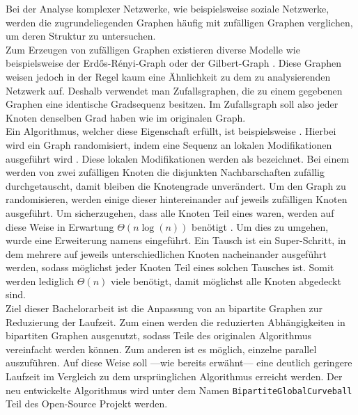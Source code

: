 Bei der Analyse komplexer Netzwerke, wie beispielsweise soziale Netzwerke, 
werden die zugrundeliegenden Graphen häufig mit zufälligen Graphen verglichen, 
um deren Struktur zu untersuchen\cite{DBLP:conf/esa/CarstensH0PTW18}.
\\

Zum Erzeugen von zufälligen Graphen existieren diverse Modelle wie 
beispielsweise der Erd\H{o}s-R\'enyi-Graph \cite{erdos}
oder der Gilbert-Graph \cite{gilbert}.
Diese Graphen
weisen jedoch in der Regel kaum eine Ähnlichkeit zu dem zu analysierenden Netzwerk auf.
Deshalb verwendet man Zufallsgraphen, die zu einem gegebenen Graphen eine identische Gradsequenz
besitzen. Im Zufallsgraph soll also jeder Knoten denselben Grad haben wie im originalen Graph.
\\

Ein Algorithmus, welcher diese Eigenschaft erfüllt, ist beispielsweise \cb{} \cite{curveball}.
Hierbei wird ein Graph randomisiert, indem eine Sequenz an lokalen Modifikationen ausgeführt wird \cite{penschuck2020recent}.
Diese lokalen Modifikationen werden als \ct{} bezeichnet. Bei einem \ct{} werden von zwei zufälligen 
Knoten die disjunkten Nachbarschaften zufällig durchgetauscht, damit bleiben die Knotengrade unverändert.
Um den Graph zu randomisieren, werden einige dieser  hintereinander auf jeweils zufälligen Knoten ausgeführt.
Um sicherzugehen, dass alle Knoten Teil eines  waren, werden auf diese Weise
in Erwartung $\Theta(n\log(n))$   benötigt \cite{DBLP:conf/esa/CarstensH0PTW18}.
Um dies zu umgehen, wurde eine Erweiterung namens \gc{} \cite{DBLP:conf/esa/CarstensH0PTW18} eingeführt. 
Ein \gc{} Tausch ist ein \glqq Super-Schritt\grqq \cite{penschuck2020recent}, in dem mehrere  auf jeweils
unterschiedlichen Knoten nacheinander ausgeführt werden, sodass möglichst jeder Knoten Teil eines solchen Tausches ist. 
Somit werden lediglich $\Theta(n)$ viele  benötigt,
damit möglichst alle Knoten abgedeckt sind.
\\

Ziel dieser Bachelorarbeit ist die Anpassung von \gc{} an bipartite Graphen zur 
Reduzierung der Laufzeit. 
Zum einen werden die reduzierten Abhängigkeiten in
 bipartiten Graphen ausgenutzt, sodass Teile des originalen \gc{} Algorithmus
vereinfacht werden können. Zum anderen ist es möglich, einzelne  parallel auszuführen.
Auf diese Weise soll ---wie bereits erwähnt--- eine deutlich geringere Laufzeit im Vergleich zu dem ursprünglichen \gc{}
Algorithmus erreicht werden.
Der neu entwickelte Algorithmus wird unter dem Namen \texttt{BipartiteGlobalCurveball} 
Teil des Open-Source Projekt \nk{} werden.
\\

